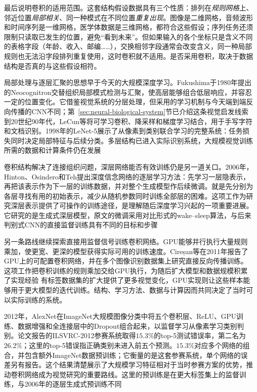 最后说明卷积的适用范围。这套结构假设数据具有三个性质：排列在\emph{规则网格}上、邻近位置\emph{局部相关}、同一种模式在不同位置\emph{重复出现}。图像是二维网格，音频波形和时间序列是一维网格，医学体数据是三维网格，都符合这些假设；序列任务还须限制只读取已发生的位置，避免“看到未来”。但如果输入的各个坐标只是含义不同的表格字段（年龄、收入、邮编……），交换相邻字段通常会改变含义，同一种局部规则也无法沿字段排列重复使用，这时卷积就不适用。是否采用卷积，取决于数据结构是否真的与这些假设相符。

局部处理与逐层汇聚的思想早于今天的大规模深度学习。Fukushima于1980年提出的Neocognitron交替组织局部模式检测与汇聚，使高层能够组合低层响应，并容忍一定的位置变化。它借鉴视觉系统的分层处理，但采用的学习机制与今天端到端反向传播的CNN不同；第~\ref{sec:neural-biological-system}节已介绍这条视觉启发线索
到20世纪90年代，LeCun等将可学习卷积、降采样和梯度学习结合，用于手写字符和文档识别。1998年的LeNet-5展示了从像素到类别联合学习的完整系统：任务损失同时决定局部特征与后续分类。多层结构已进入实际识别系统，大规模视觉训练所需的数据和计算条件仍在发展

卷积结构解决了连接组织问题，深层网络能否有效训练仍是另一道关口。2006年，Hinton、Osindero和Teh提出深度信念网络的逐层学习方法：先学习一层隐表示，再把该表示作为下一层的训练数据，并对整个生成模型作后续微调。就是先分别为各层寻找有用的初始表示，减少从随机参数同时训练全部层的困难。这项工作为研究深层表示提供了可操作的训练途径，是理解随后深度学习兴起的一项重要进展。它研究的是生成式深层模型，原文的微调采用对比形式的wake--sleep算法，与后来判别式CNN的直接监督训练具有不同的目标和步骤

另一条路线继续探索直接用监督信号训练卷积网络。GPU能够并行执行大量规则乘加，使更宽、更深的模型获得实际可用的训练速度。Cireșan等在2011年报告了GPU上的可配置卷积网络，并在多个图像识别数据集上研究直接反向传播训练。这项工作把卷积训练的规则乘加交给GPU执行，为随后扩大模型和数据规模积累了实现经验
有标签数据集的扩大提供了更多视觉变化，GPU实现则让这些样本能够用于更大模型的迭代训练。结构、学习方法、数据与计算因而共同决定了当时可以实际训练的系统。

2012年，AlexNet在ImageNet大规模图像分类中将五个卷积层、ReLU、GPU训练、数据增强和全连接层中的Dropout组合起来，以监督学习从像素学习类别判别。论文报告的ILSVRC-2012参赛系统取得$15.3\%$的top-5测试错误率，第二名为$26.2\%$；这里的top-5错误指正确类别未进入前五个预测。$15.3\%$对应多个网络的组合，并包含额外ImageNet数据预训练；它衡量的是这套参赛系统，单个网络的误差另有报告。这个结果清楚展示了大规模学习特征相对于当时参赛方案的优势，推动卷积网络成为视觉研究的重要路线。这里的预训练是在更大标签集上的监督训练，与2006年的逐层生成式预训练不同

